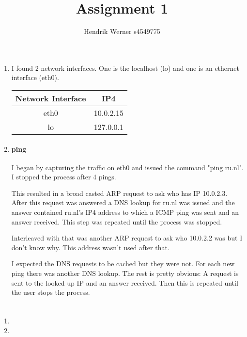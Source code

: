 \documentclass[12pt, a4paper]{article}
\title{Assignment 1}
\author{Hendrik Werner s4549775}
\begin{document}
\maketitle

\section{} %
\begin{enumerate}[a]
	\item %
	\begin{multicols}{2}
		I found 2 network interfaces. One is the localhost (lo) and one is an ethernet interface (eth0).

		\begin{tabular}{c|c}
			Network Interface & IP4\\\hline
			eth0 & 10.0.2.15\\
			lo & 127.0.0.1\\
		\end{tabular}
	\end{multicols}

	\item %
	\paragraph{ping}
	I began by capturing the traffic on eth0 and issued the command "ping ru.nl". I stopped the process after 4 pings.

	This resulted in a broad casted ARP request to ask who has IP 10.0.2.3. After this request was answered a DNS lookup for ru.nl was issued and the answer contained ru.nl's IP4 address to which a ICMP ping was sent and an answer received. This step was repeated until the process was stopped.

	Interleaved with that was another ARP request to ask who 10.0.2.2 was but I don't know why. This address wasn't used after that.

	I expected the DNS requests to be cached but they were not. For each new ping there was another DNS lookup. The rest is pretty obvious: A request is sent to the looked up IP and an answer received. Then this is repeated until the user stops the process.
\end{enumerate}

\section{} %
\begin{enumerate}[a]
	\item %
	\item %
\end{enumerate}
\end{document}
